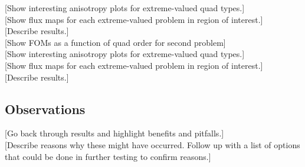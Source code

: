 [Show interesting anisotropy plots for extreme-valued quad types.] \\

[Show flux maps for each extreme-valued problem in region of interest.] \\

[Describe results.] \\

[Show FOMs as a function of quad order for second problem] \\

[Show interesting anisotropy plots for extreme-valued quad types.] \\

[Show flux maps for each extreme-valued problem in region of interest.] \\

[Describe results.] \\

\subsection{Observations}
\label{subsec:observations}

[Go back through results and highlight benefits and pitfalls.] \\

[Describe reasons why these might have occurred. Follow up with a list of options
that could be done in further testing to confirm reasons.] \\
